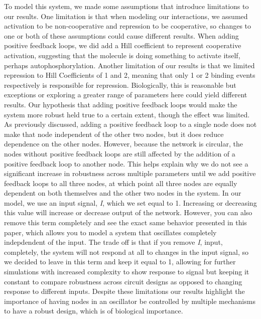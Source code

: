 \documentclass{article}
\begin{document}
To model this system, we made some assumptions that introduce limitations to our results. One limitation is that when modeling our interactions, we assumed activation to be non-cooperative and repression to be cooperative, so changes to one or both of these assumptions could cause different results. When adding positive feedback loops, we did add a Hill coefficient to represent cooperative activation, suggesting that the molecule is doing something to activate itself, perhaps autophosphorylation. Another limitation of our results is that we limited repression to Hill Coefficients of 1 and 2, meaning that only 1 or 2 binding events respectively is responsible for repression. Biologically, this is reasonable but exceptions or exploring a greater range of parameters here could yield different results. Our hypothesis that adding positive feedback loops would make the system more robust held true to a certain extent, though the effect was limited. As previously discussed, adding a positive feedback loop to a single node does not make that node independent of the other two nodes, but it does reduce dependence on the other nodes. However, because the network is circular, the nodes without positive feedback loops are still affected by the addition of a positive feedback loop to another node. This helps explain why we do not see a significant increase in robustness across multiple parameters until we add positive feedback loops to all three nodes, at which point all three nodes are equally dependent on both themselves and the other two nodes in the system. In our model, we use an input signal, \textit{I}, which we set equal to 1. Increasing or decreasing this value will increase or decrease output of the network. However, you can also remove this term completely and see the exact same behavior presented in this paper, which allows you to model a system that oscillates completely indepdendent of the input. The trade off is that if you remove \textit{I}, input, completely, the system will not respond at all to changes in the input signal, so we decided to leave in this term and keep it equal to 1, allowing for further simulations with increased complexity to show response to signal but keeping it constant to compare robustness across circuit designs as opposed to changing response to different inputs. Despite these limitations our results highlight the importance of having nodes in an oscillator be controlled by multiple mechanisms to have a robust design, which is of biological importance.
\end{document}
